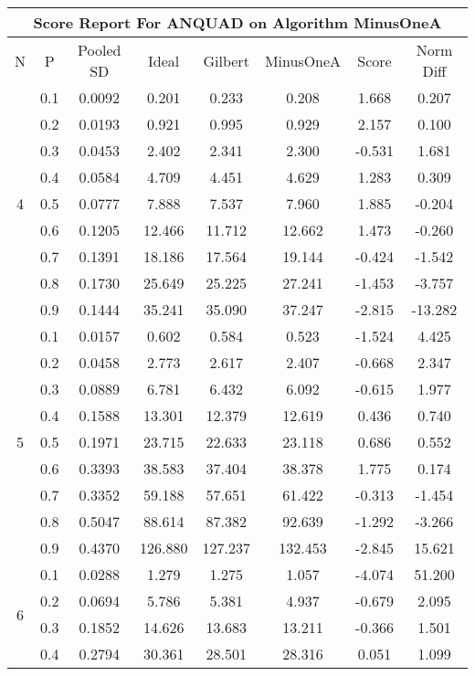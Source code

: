 \documentclass[11pt,a4paper]{report}
\begin{document}
\begin{longtable}{ | c | c || c | c | c | c | c | c | }
\hline
\multicolumn{8}{|c|}{ Score Report For ANQUAD on Algorithm MinusOneA} \\
\hline
N & P & Pooled SD &  Ideal &  Gilbert & MinusOneA  & Score & Norm Diff \\
 \hline
 \hline
 \endhead
\multirow{9}{*}{4} & 0.1 & 0.0092 & 0.201 & 0.233 & 0.208 & 1.668 & 0.207 \\
 & 0.2 & 0.0193 & 0.921 & 0.995 & 0.929 & 2.157 & 0.100 \\
 & 0.3 & 0.0453 & 2.402 & 2.341 & 2.300 & -0.531 & 1.681 \\
 & 0.4 & 0.0584 & 4.709 & 4.451 & 4.629 & 1.283 & 0.309 \\
 & 0.5 & 0.0777 & 7.888 & 7.537 & 7.960 & 1.885 & -0.204 \\
 & 0.6 & 0.1205 & 12.466 & 11.712 & 12.662 & 1.473 & -0.260 \\
 & 0.7 & 0.1391 & 18.186 & 17.564 & 19.144 & -0.424 & -1.542 \\
 & 0.8 & 0.1730 & 25.649 & 25.225 & 27.241 & -1.453 & -3.757 \\
 & 0.9 & 0.1444 & 35.241 & 35.090 & 37.247 & -2.815 & -13.282 \\
 \hline
\multirow{9}{*}{5} & 0.1 & 0.0157 & 0.602 & 0.584 & 0.523 & -1.524 & 4.425 \\
 & 0.2 & 0.0458 & 2.773 & 2.617 & 2.407 & -0.668 & 2.347 \\
 & 0.3 & 0.0889 & 6.781 & 6.432 & 6.092 & -0.615 & 1.977 \\
 & 0.4 & 0.1588 & 13.301 & 12.379 & 12.619 & 0.436 & 0.740 \\
 & 0.5 & 0.1971 & 23.715 & 22.633 & 23.118 & 0.686 & 0.552 \\
 & 0.6 & 0.3393 & 38.583 & 37.404 & 38.378 & 1.775 & 0.174 \\
 & 0.7 & 0.3352 & 59.188 & 57.651 & 61.422 & -0.313 & -1.454 \\
 & 0.8 & 0.5047 & 88.614 & 87.382 & 92.639 & -1.292 & -3.266 \\
 & 0.9 & 0.4370 & 126.880 & 127.237 & 132.453 & -2.845 & 15.621 \\
 \hline
\multirow{9}{*}{6} & 0.1 & 0.0288 & 1.279 & 1.275 & 1.057 & -4.074 & 51.200 \\
 & 0.2 & 0.0694 & 5.786 & 5.381 & 4.937 & -0.679 & 2.095 \\
 & 0.3 & 0.1852 & 14.626 & 13.683 & 13.211 & -0.366 & 1.501 \\
 & 0.4 & 0.2794 & 30.361 & 28.501 & 28.316 & 0.051 & 1.099 \\

\end{longtable}
\end{document}
